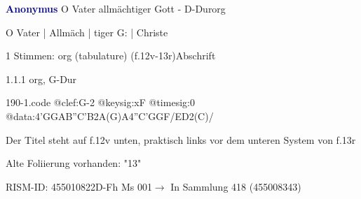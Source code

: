 \documentclass[twocolumn]{book}
\begin{document}
\par \vspace{7pt} \textcolor{darkblue}{\textbf{Anonymus  }}\hfillplus{\textbf{[190]}}\newline O Vater allmächtiger Gott - D-Dur\newline org
\par \begin{itshape} O Vater | Allmäch | tiger G: | Christe\end{itshape} 
\par \textcolor{darkblue}{}  1 Stimmen: org (tabulature)  (f.12v-13r)\newline Abschrift
\par 1.1.1  org, G-Dur  
\begin{filecontents*}{190-1.code}
@clef:G-2
@keysig:xF
@timesig:0
@data:4'GGAB''C'B2A(G)A4''C'GGF/ED2(C)/
\end{filecontents*}
\newline
%
\par Der Titel steht auf f.12v unten, praktisch links vor dem unteren System von f.13r
\par Alte Foliierung vorhanden: "13"
\par RISM-ID: 455010822\newline D-Fh  Ms 001\newline $\rightarrow$ In Sammlung 418 (455008343)
      
\end{document}

